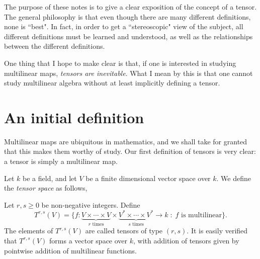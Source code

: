 \documentclass{owmaths}
\begin{document}
The purpose of these notes is to give a clear exposition of the concept of a tensor.
The general philosophy is that even though there are many different definitions,
none is ``best". In fact, in order to get a ``stereoscopic" view
of the subject, all different definitions must be learned and understood, as
well as the relationships between the different definitions.

One thing that I hope to make clear is that, if one is interested
in studying multilinear maps, \emph{tensors are inevitable}. What I mean by
this is that one cannot study multilinear algebra without at least implicitly
defining a tensor.

\section{An initial definition}
Multilinear maps are ubiquitous in mathematics, and we shall take for granted 
that this makes them worthy of study. Our first definition of tensors
is very clear: a tensor is simply a multilinear map.

Let $k$ be a field, and let $V$ be a finite dimensional vector space over $k$.
We define the \emph{tensor space} as follows,
\begin{definition}
    Let $r,s \geq 0$ be non-negative integers. Define
    \begin{equation*}
        T^{r,s}(V) = \{f:\underbrace{V\times \cdots \times V}_{r\text{ times}} \times \underbrace{V^* \times \cdots \times V^*}_{s\text{ times}} \rightarrow k\;:\; f\text{ is multilinear}\}.
    \end{equation*}
    The elements of $T^{r,s}(V)$ are called tensors of type $(r,s)$.
    It is easily verified that $T^{r,s}(V)$ forms a vector space over $k$, with
    addition of tensors given by pointwise addition of multilinear functions.    
\end{definition}
\end{document}
